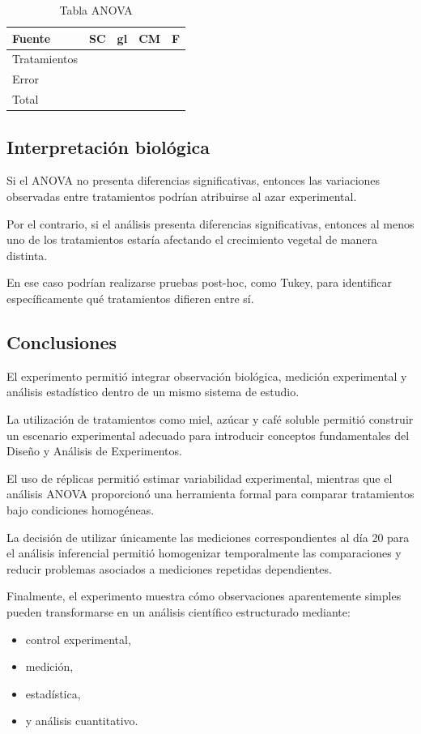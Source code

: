 \begin{table}[H]
\centering
\begin{tabular}{lcccc}
\toprule
Fuente & SC & gl & CM & F \\
\midrule
Tratamientos & & & & \\
Error & & & & \\
Total & & & & \\
\bottomrule
\end{tabular}
\caption{Tabla ANOVA}
\end{table}

\subsection{Interpretación biológica}

Si el ANOVA no presenta diferencias significativas, entonces las variaciones observadas entre tratamientos podrían atribuirse al azar experimental.

Por el contrario, si el análisis presenta diferencias significativas, entonces al menos uno de los tratamientos estaría afectando el crecimiento vegetal de manera distinta.

En ese caso podrían realizarse pruebas post-hoc, como Tukey, para identificar específicamente qué tratamientos difieren entre sí.

\subsection{Conclusiones}

El experimento permitió integrar observación biológica, medición experimental y análisis estadístico dentro de un mismo sistema de estudio.

La utilización de tratamientos como miel, azúcar y café soluble permitió construir un escenario experimental adecuado para introducir conceptos fundamentales del Diseño y Análisis de Experimentos.

El uso de réplicas permitió estimar variabilidad experimental, mientras que el análisis ANOVA proporcionó una herramienta formal para comparar tratamientos bajo condiciones homogéneas.

La decisión de utilizar únicamente las mediciones correspondientes al día 20 para el análisis inferencial permitió homogenizar temporalmente las comparaciones y reducir problemas asociados a mediciones repetidas dependientes.

Finalmente, el experimento muestra cómo observaciones aparentemente simples pueden transformarse en un análisis científico estructurado mediante:

\begin{itemize}
    \item control experimental,
    \item medición,
    \item estadística,
    \item y análisis cuantitativo.
\end{itemize}
